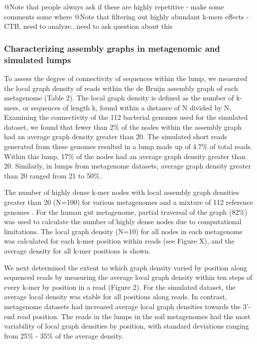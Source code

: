 \documentclass[11pt]{article} %
\begin{document}
@Note that people always ask if these are highly repetitive - make some comments some where
@Note that filtering out highly abundant k-mers effects - CTB, need to analyze...need to ask question about this

\subsubsection{Characterizing assembly graphs in metagenomic and simulated lumps}

To assess the degree of connectivity of sequences within the lump, we measured the local graph density of reads within the de Bruijn assembly graph of each metagenome (Table 2).  The local graph density is defined as the number of k-mers, or sequences of length k, found within a distance of N divided by N.  Examining the connectivity of the 112 bacterial genomes used for the simulated dataset, we found that fewer than 2\% of the nodes within the assembly graph had an average graph density greater than 20.   The simulated short reads generated from these genomes resulted in a lump made up of 4.7\% of total reads.  Within this lump, 17\% of the nodes had an average graph density greater than 20.  Similarly, in lumps from metagenome datasets, average graph density greater than 20 ranged from 21 to 50\%.  

\begin{table}
\caption{The number of highly dense k-mer nodes with local assembly graph densities greater than 20 (N=100) for various metagenomes and a mixture of 112 reference genomes \cite{Pignatelli:2011p742}. For the human gut metagenome, partial traversal of the graph (82\%) was used to calculate the number of highly dense nodes due to computational limitations.  The local graph density (N=10) for all nodes in each metagenome was calculated for each k-mer position within reads (see Figure X), and the average density for all k-mer positions is shown.}  
\end{table}

We next determined the extent to which graph density varied by position along sequenced reads by measuring the average local graph density within ten steps of every k-mer by position in a read (Figure 2).  For the simulated dataset, the average local density was stable for all positions along reads.  In contrast, metagenome datasets had increased average local graph densities towards the 3'-end read position.  The reads in the lumps in the soil metagenomes had the most variability of local graph densities by position, with standard deviations ranging from 25\% - 35\% of the average density.
\end{document}
